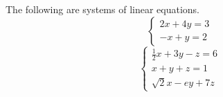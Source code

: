 \begin{example}
    The following are systems of linear equations.
    \[
    \begin{cases}
        2x+4y = 3 \\
        -x+y =2
    \end{cases}
    \]
    \[\begin{cases}
        \frac{1}{2}x + 3y -z =6 \\
        x+y+z=1 \\
        \sqrt{2}x - e y +7z
    \end{cases}\]
\end{example}